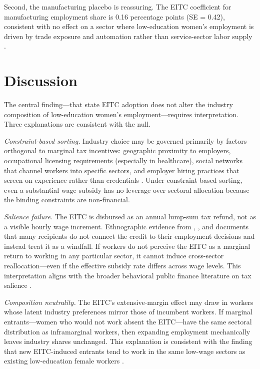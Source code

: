 \documentclass[12pt]{article}
\begin{document}
Second, the manufacturing placebo is reassuring. The EITC coefficient for manufacturing employment share is 0.16 percentage points (SE = 0.42), consistent with no effect on a sector where low-education women's employment is driven by trade exposure and automation rather than service-sector labor supply \citep{autor2003, pierce2016}.


\section{Discussion}

The central finding---that state EITC adoption does not alter the industry composition of low-education women's employment---requires interpretation. Three explanations are consistent with the null.

\textit{Constraint-based sorting.} Industry choice may be governed primarily by factors orthogonal to marginal tax incentives: geographic proximity to employers, occupational licensing requirements (especially in healthcare), social networks that channel workers into specific sectors, and employer hiring practices that screen on experience rather than credentials \citep{ioannides2004, bayer2008}. Under constraint-based sorting, even a substantial wage subsidy has no leverage over sectoral allocation because the binding constraints are non-financial.

\textit{Salience failure.} The EITC is disbursed as an annual lump-sum tax refund, not as a visible hourly wage increment. Ethnographic evidence from \citet{romich2006}, \citet{sykes2015}, and \citet{halpern2015} documents that many recipients do not connect the credit to their employment decisions and instead treat it as a windfall. If workers do not perceive the EITC as a marginal return to working in any particular sector, it cannot induce cross-sector reallocation---even if the effective subsidy rate differs across wage levels. This interpretation aligns with the broader behavioral public finance literature on tax salience \citep{chetty2009}.

\textit{Composition neutrality.} The EITC's extensive-margin effect may draw in workers whose latent industry preferences mirror those of incumbent workers. If marginal entrants---women who would not work absent the EITC---have the same sectoral distribution as inframarginal workers, then expanding employment mechanically leaves industry shares unchanged. This explanation is consistent with the finding that new EITC-induced entrants tend to work in the same low-wage sectors as existing low-education female workers \citep{rothstein2010}.
\end{document}
